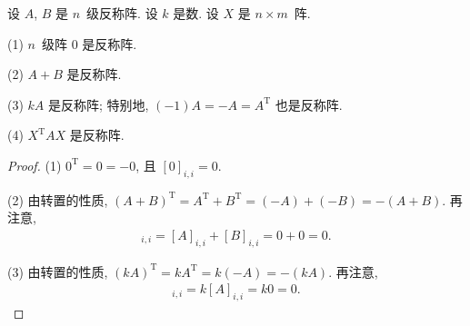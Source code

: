 \documentclass[../libro.tex]{subfiles}
\begin{document}
\begin{theorem}
    设 \(A\), \(B\) 是 \(n\)~级反称阵.
    设 \(k\) 是数.
    设 \(X\) 是 \(n \times m\)~阵.

    (1)
    \(n\)~级阵 \(0\) 是反称阵.

    (2)
    \(A + B\) 是反称阵.

    (3)
    \(kA\) 是反称阵;
    特别地, \((-1)A = -A = A^{\mathrm{T}}\) 也是反称阵.

    (4)
    \(X^{\mathrm{T}} A X\) 是反称阵.
\end{theorem}

\begin{proof}
    (1)
    \(0^{\mathrm{T}} = 0 = -0\),
    且 \([0]_{i,i} = 0\).

    (2)
    由转置的性质,
    \((A + B)^{\mathrm{T}} = A^{\mathrm{T}} + B^{\mathrm{T}}
    = (-A) + (-B) = -(A + B)\).
    再注意,
    \begin{align*}
        [A + B]_{i,i} = [A]_{i,i} + [B]_{i,i} = 0 + 0 = 0.
    \end{align*}

    (3)
    由转置的性质,
    \((kA)^{\mathrm{T}} = kA^{\mathrm{T}} = k(-A) = -(kA)\).
    再注意,
    \begin{align*}
        [kA]_{i,i} = k [A]_{i,i} = k 0 = 0.
    \end{align*}


\end{proof}
\end{document}
